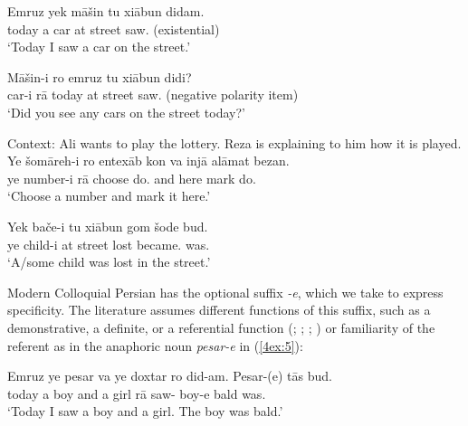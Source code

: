 \documentclass[output=paper]{langsci/langscibook}
\begin{document}
\begin{exe}
\ex\label{4ex:1}
\gll 	Emruz yek māšin tu xiābun didam. 		 \\
  	today a car at street saw.{}		\hspace*{3.8cm}(existential) \\
\glt `Today I saw a car on the street.'

\ex\label{4ex:2}
\gll	Māšin-i ro emruz tu xiābun didi?		 \\
	car-i rā today at street saw.{}		\hspace*{2cm}(negative polarity item) \\
\glt	`Did you see any cars on the street today?'

\ex\label{4ex:3}
Context: Ali wants to play the lottery. Reza is explaining to him how it is played.
\exi{}
\gll	Ye šomāreh-i  ro 	entexāb   kon        va  injā		alāmat 	bezan.			 \\
	ye number-i   rā 	choose    do.{}  and here  	mark    	do.{}	\hspace*{0.4cm}{(free choice)} \\
\glt	`Choose a number and mark it here.'

\ex\label{4ex:4}
\gll	Yek bače-i		tu xiābun	gom	šode				bud.			 \\
	ye     child-i   	at street	lost	became.{\sc{3sg}} 	was.{}	\hspace*{1.5cm}{(ref. ignorance)} \\
\glt	`A/some child was lost in the street.'
\end{exe}

Modern Colloquial Persian has the optional suffix {\emph{-e}}, which we take to express specificity. The literature assumes different functions of this suffix, such as a demonstrative, a definite, or a referential function (\citealt[][40]{windfuhr:79}; \citealt[][173-177]{hincha:61}; \citealt[][163]{lazard:57}; \citealt[][67]{ghomeshi:03}) or familiarity of the referent \citep{hedberg:etal:09} as in the anaphoric noun {\emph{pesar-e}} in (\ref{4ex:5}):

\begin{exe}
\ex\label{4ex:5}
\gll	Emruz	ye 	pesar	va	ye 	doxtar 	ro   did-am.    		Pesar-(e)	tās	bud. \\
	today	a	boy		and	a	girl      	rā   saw-{} 	boy-e	bald 	was.{} \\
\glt	`Today I saw a boy and a girl. The boy was bald.'
\end{exe}
\end{document}

